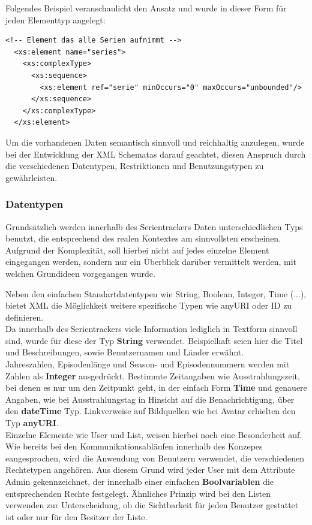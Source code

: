 Folgendes Beispiel veranschaulicht den Ansatz und wurde in dieser Form für jeden Elementtyp angelegt:


\begin{lstlisting}[label=xsd-definition,caption= Auszug aus der Series.xsd Definition]
<!-- Element das alle Serien aufnimmt -->
  <xs:element name="series">
    <xs:complexType>
      <xs:sequence>
        <xs:element ref="serie" minOccurs="0" maxOccurs="unbounded"/>
      </xs:sequence>
    </xs:complexType>
  </xs:element>
\end{lstlisting}


Um die vorhandenen Daten semantisch sinnvoll und reichhaltig anzulegen, wurde bei der Entwicklung der XML Schematas darauf geachtet, diesen Anspruch
durch die verschiedenen Datentypen, Restriktionen und Benutzungstypen zu gewährleisten.

\newpage

\subsubsection{Datentypen}
Grundsätzlich werden innerhalb des Serientrackers Daten unterschiedlichen Typs benutzt, die entsprechend des realen Kontextes am sinnvollsten erscheinen.
Aufgrund der Komplexität, soll hierbei nicht auf jedes einzelne Element eingegangen werden, sondern nur ein Überblick darüber vermittelt werden, mit welchen Grundideen vorgegangen wurde.

Neben den einfachen Standartdatentypen wie String, Boolean, Integer, Time (...), bietet XML die Möglichkeit weitere spezifische Typen wie anyURI oder ID zu definieren.\\
Da innerhalb des Serientrackers viele Information lediglich in Textform sinnvoll sind, wurde für diese der Typ \textbf{String} verwendet. Beispielhaft seien hier die Titel und Beschreibungen, sowie Benutzernamen und Länder erwähnt.\\
Jahreszahlen, Episodenlänge und Season- und Episodennummern werden mit Zahlen als \textbf{Integer} ausgedrückt. Bestimmte Zeitangaben wie Ausstrahlungszeit, bei denen es nur um den Zeitpunkt geht, in der einfach Form \textbf{Time} und genauere Angaben, wie bei Ausstrahlungstag in Hinsicht auf die Benachrichtigung, über den \textbf{dateTime} Typ.
Linkverweise auf Bildquellen wie bei Avatar erhielten den Typ \textbf{anyURI}.\\

Einzelne Elemente wie User und List, weisen hierbei noch eine Besonderheit auf. Wie bereits bei den Kommunikationsabläufen innerhalb des Konzepes eangesprochen, wird die Anwendung von Benutzern verwendet, die verschiedenen Rechtetypen angehören. Aus diesem Grund wird jeder User mit dem Attribute Admin gekennzeichnet, der innerhalb einer einfachen \textbf{Boolvariablen} die entsprechenden Rechte festgelegt. Ähnliches Prinzip wird bei den Listen verwenden zur Unterscheidung, ob die Sichtbarkeit für jeden Benutzer gestattet ist oder nur für den Besitzer der Liste.

